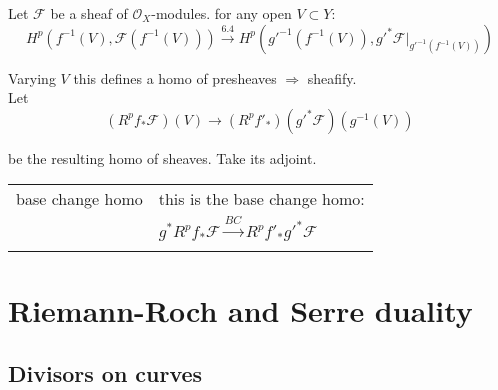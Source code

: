 \documentclass[a4paper, 12pt]{article}
\newcommand{\caf}{\mathcal{F}}
\newcommand{\oxmods}{$\mathcal{O}_X$-modules}
\begin{document}
Let $\caf$ be a sheaf of \oxmods . for any open $V \subset Y$:
\[ H^p(f^{-1}(V) , \caf(f^{-1}(V))) \xrightarrow{6.4} H^p(g'^{-1}(f^{-1}(V)) , g'^* \caf|_{g'^{-1}(f^{-1}(V))}) \]


%
%
%
%
%
%
%
%



Varying $V$ this defines a homo of presheaves $\Rightarrow$ sheafify.\\

Let
\[
(R^pf_* \caf)(V) \longrightarrow (R^pf'_*)(g'^* \caf)(g^{-1}(V))
%
%
%
%
%
\]


be the resulting homo of sheaves. Take its adjoint.


\begin{longtable}{p{}  p{} }

  base change homo & this is the base change homo:\\

  & $g^*R^pf_* \caf \xrightarrow{BC} R^pf'_*g'^* \caf$\\

  &\\

    
\end{longtable}


\section{Riemann-Roch and Serre duality}

\subsection{Divisors on curves}

\begin{longtable}{p{}  p{} }

  
\end{longtable}


\begin{longtable}{p{}  p{} }

  
\end{longtable}
\end{document}
